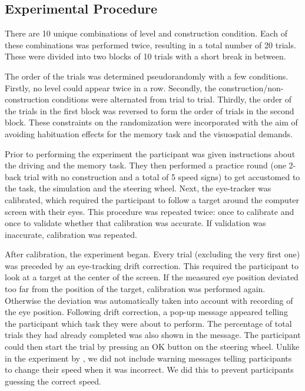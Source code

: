 \subsection{Experimental Procedure}
There are 10 unique combinations of \nback level and construction condition.
Each of these combinations was performed twice, resulting in a total number of 20 trials.
These were divided into two blocks of 10 trials with a short break in between.

The order of the trials was determined pseudorandomly with a few conditions. 
Firstly, no \nback level could appear twice in a row. 
Secondly, the construction/non-construction conditions were alternated from trial to trial. 
Thirdly, the order of the trials in the first block was reversed to form the order of trials in the second block.
These constraints on the randomization were incorporated with the aim of avoiding habituation effects for the memory task and the visuospatial demands.

Prior to performing the experiment the participant was given instructions about the driving and the memory task. 
They then performed a practice round (one 2-back trial with no construction and a total of 5 speed signs) to get accustomed to the task, the simulation and the steering wheel. 
Next, the eye-tracker was calibrated, which required the participant to follow a target around the computer screen with their eyes. 
This procedure was repeated twice: once to calibrate and once to validate whether that calibration was accurate. 
If validation was inaccurate, calibration was repeated.

After calibration, the experiment began. 
Every trial (excluding the very first one) was preceded by an eye-tracking drift correction. 
This required the participant to look at a target at the center of the screen. 
If the measured eye position deviated too far from the position of the target, calibration was performed again. 
Otherwise the deviation was automatically taken into account with recording of the eye position.
Following drift correction, a pop-up message appeared telling the participant which \nback task they were about to perform.
The percentage of total trials they had already completed was also shown in the message. 
The participant could then start the trial by pressing an OK button on the steering wheel.
Unlike in the experiment by \citeauthor{Scheunemann2019}, we did not include warning messages telling participants to change their speed when it was incorrect.
We did this to prevent participants guessing the correct speed.

